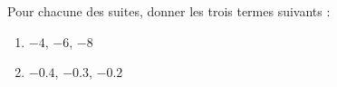 
\begin{exercice}\label{exo2smath-0073}

    Pour chacune des suites, donner les trois termes suivants :
    \begin{enumerate}
        \item
            \( -4\), \( -6\), \( -8\)
        \item
            \(-0.4\), \( -0.3\), \( -0.2\)
    \end{enumerate}

\end{exercice}
